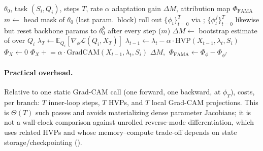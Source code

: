 \begin{algorithm}[t]
\caption{\fama}
\label{alg:fama}
\footnotesize
\begin{algorithmic}[1]
\Require $\theta_0$, task $(S_i,Q_i)$, steps $T$, rate $\alpha$
\Ensure adaptation gain $\Delta M$, attribution map $\Phi_{\mathrm{FAMA}}$
\State $m \gets$ head mask of $\theta_0$ (last param.\ block)
\State roll out $\{\phi_t\}_{t=0}^T$ via ; $\{\phi_t^f\}_{t=0}^T$ likewise but reset backbone params to $\theta_0^b$ after every step ($m$)
\State $\Delta M \gets$ bootstrap estimate of  over $Q_i$
    \State $\lambda_T \gets \mathbb{E}_{Q_i}[\nabla_\phi \mathcal{L}(Q_i, X_T)]$ 
        \State $\lambda_{t-1} \gets \lambda_t - \alpha\cdot\mathrm{HVP}(X_{t-1}, \lambda_t, S_i)$ 
    \EndFor
    \State $\Phi_X \gets 0$
        \State $\Phi_X \mathrel{+}= \alpha \cdot \mathrm{GradCAM}(X_{t-1}, \lambda_t, S_i)$ 
    \EndFor
\EndFor
\State \Return $\Delta M$, $\ \Phi_{\mathrm{FAMA}} \gets \Phi_{\phi} - \Phi_{\phi^f}$
\end{algorithmic}
\end{algorithm}

\paragraph{Practical overhead.} Relative to one static Grad-CAM call (one forward, one backward, at $\phi_T$),  costs, per branch: $T$ inner-loop steps, $T$ HVPs, and $T$ local Grad-CAM projections. This is $\Theta(T)$ such passes and avoids materializing dense parameter Jacobians; it is not a wall-clock comparison against unrolled reverse-mode differentiation, which uses related HVPs and whose memory--compute trade-off depends on state storage/checkpointing ().
